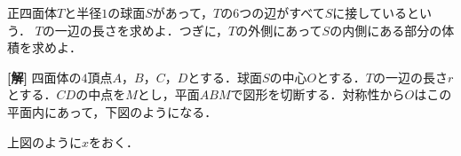 \documentclass[a4j]{jarticle}
\begin{document}

     \begin{oframed}
     正四面体$T$と半径$1$の球面$S$があって，$T$の$6$つの辺がすべて$S$に接しているという．
     $T$の一辺の長さを求めよ．つぎに，$T$の外側にあって$S$の内側にある部分の体積を求めよ．
     \end{oframed}

\setlength{\columnseprule}{0.4pt}
\begin{multicols}{2}
{\bf[解]} 四面体の$4$頂点$A$，$B$，$C$，$D$とする．球面$S$の中心$O$とする．$T$の一辺の長さ$r$とする．$CD$の中点を$M$とし，平面$ABM$で図形を切断する．対称性から$O$はこの平面内にあって，下図のようになる．



上図のように$x$をおく．

　
     
\newpage
\end{multicols}
\end{document}
